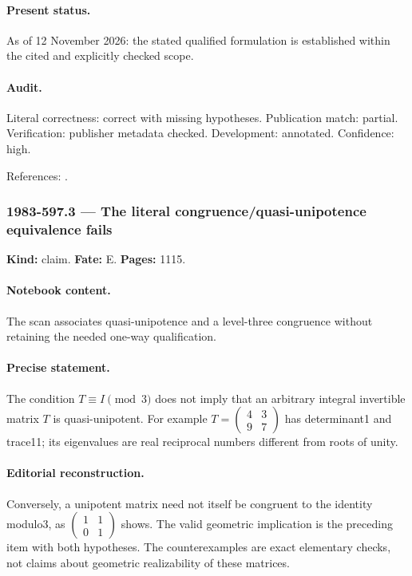 \paragraph{Present status.} As of 12 November 2026: the stated qualified formulation is established within the cited and explicitly checked scope.

\paragraph{Audit.} Literal correctness: correct with missing hypotheses. Publication match: partial. Verification: publisher metadata checked. Development: annotated. Confidence: high.

\noindent References: \citep{schmid1973variation}.\par

\subsubsection{1983-597.3 --- The literal congruence/quasi-unipotence equivalence fails}

\label{item:1983-597.3}

\noindent\textbf{Kind:} claim. \textbf{Fate:} E. \textbf{Pages:} 1115.\par

\paragraph{Notebook content.} The scan associates quasi-unipotence and a level-three congruence without retaining the needed one-way qualification.

\paragraph{Precise statement.} The condition \(T\equiv I\pmod3\) does not imply that an arbitrary integral invertible matrix \(T\) is quasi-unipotent. For example \(T=\begin{pmatrix}4&3\\9&7\end{pmatrix}\) has determinant1 and trace11; its eigenvalues are real reciprocal numbers different from roots of unity.

\paragraph{Editorial reconstruction.} Conversely, a unipotent matrix need not itself be congruent to the identity modulo3, as \(\begin{pmatrix}1&1\\0&1\end{pmatrix}\) shows. The valid geometric implication is the preceding item with both hypotheses. The counterexamples are exact elementary checks, not claims about geometric realizability of these matrices.

